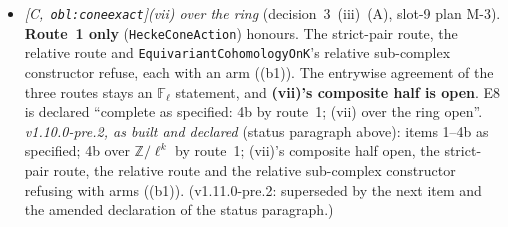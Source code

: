 \documentclass[11pt]{article}
\theoremstyle{remark}
\newcommand{\F}{\mathbb{F}}
\newcommand{\Z}{\mathbb{Z}}
\newcommand{\Fl}{\F_\ell}
\newcommand{\HA}[1]{[C,~\texttt{#1}]}      %
\begin{document}
\begin{itemize}
\item \emph{\HA{obl:coneexact}(vii) over the ring} (decision~3~(iii)~(A), slot-9 plan M-3).
  \textbf{Route~1 only} (\texttt{HeckeConeAction}) honours. The strict-pair route, the relative
  route and \texttt{EquivariantCohomologyOnK}'s relative sub-complex constructor refuse, each with
  an arm ((b1)). The entrywise agreement of the three routes stays an $\Fl$ statement, and
  \textbf{(vii)'s composite half is open}. E8 is declared ``complete as specified: 4b by route~1;
  (vii) over the ring open''. \emph{v1.10.0-pre.2, as built and declared} (status paragraph
  above): items 1--4b as specified; 4b over $\Z/\ell^k$ by route~1; (vii)'s composite half open,
  the strict-pair route, the relative route and the relative sub-complex constructor refusing
  with arms ((b1)). (v1.11.0-pre.2: superseded by the next item and the amended declaration of the
  status paragraph.)


\end{itemize}
\end{document}
